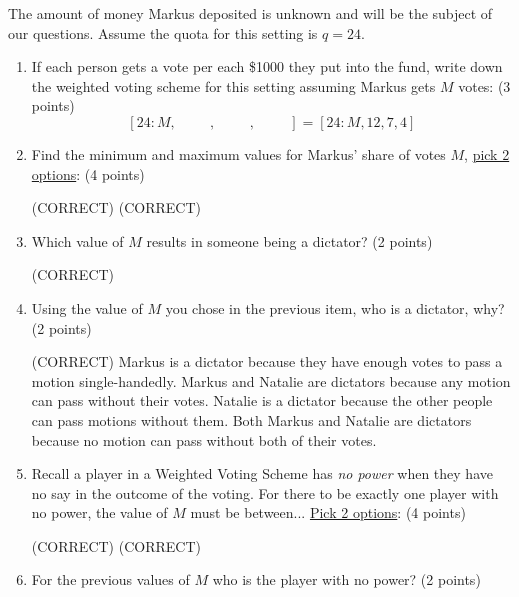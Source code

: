 \documentclass[12pt]{exam}
\begin{document}
\begin{enumerate}
The amount of money Markus deposited is unknown and will be the subject of our questions. Assume the quota for this setting is $q=24$.
\begin{enumerate}
\item \label{firstQnSec2} If each person gets a vote per each \$1000 they put into the fund, write down the weighted voting scheme for this setting assuming Markus gets $M$ votes: (3 points)\vspace{1em}
$$[24:M,\hspace{1cm},\hspace{1cm},\hspace{1cm}]=[24:M,12,7,4]$$
\vfill
\newpage
\item Find the minimum and maximum values for Markus' share of votes $M$, \underline{pick 2 options}: (4 points)
\begin{checkboxes}
    (CORRECT)
    (CORRECT)
\end{checkboxes}
\vfill
\item Which value of $M$ results in someone being a dictator? (2 points)
\begin{checkboxes}
    (CORRECT)
\end{checkboxes}
\vfill
\item Using the value of $M$ you chose in the previous item, who is a dictator, why? (2 points)
\begin{checkboxes}
    \choice (CORRECT) Markus is a dictator because they have enough votes to pass a motion single-handedly.
    \choice Markus and Natalie are dictators because any motion can pass without their votes.
    \choice Natalie is a dictator because the other people can pass motions without them.
    \choice Both Markus and Natalie are dictators because no motion can pass without both of their votes.
\end{checkboxes}
\vfill
\item Recall a player in a Weighted Voting Scheme has \emph{no power} when they have no say in the outcome of the voting. For there to be exactly one player with no power, the value of $M$ must be between... \underline{Pick 2 options}: (4 points)
\begin{checkboxes}
     (CORRECT)
     (CORRECT)
\end{checkboxes}
\vfill
\newpage
\item For the previous values of $M$ who is the player with no power? (2 points)

\end{enumerate}
\end{enumerate}
\end{document}
